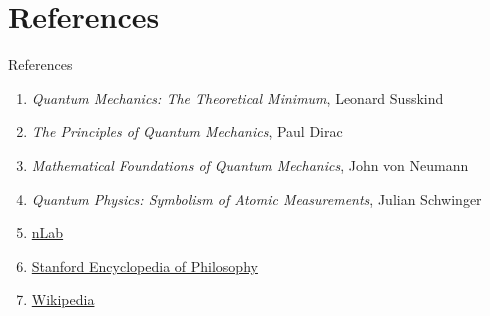 \documentclass[9pt,handout]{beamer}
\begin{document}
\section{References}
\begin{frame}{References}
\begin{enumerate}
\item \emph{Quantum Mechanics: The Theoretical Minimum}, Leonard Susskind
\item \emph{The Principles of Quantum Mechanics}, Paul Dirac
\item \emph{Mathematical Foundations of Quantum Mechanics}, John von Neumann
\item \emph{Quantum Physics: Symbolism of Atomic Measurements}, Julian Schwinger
\item \href{https://ncatlab.org/nlab/show/HomePage}{nLab}
\item \href{https://plato.stanford.edu/}{Stanford Encyclopedia of Philosophy}
\item \href{https://www.wikipedia.org/}{Wikipedia}
\end{enumerate}
\end{frame}

\end{document}

